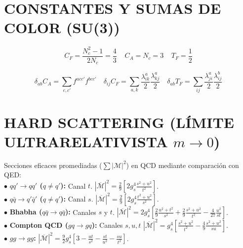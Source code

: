 \section{CONSTANTES Y SUMAS DE COLOR (SU(3))}

$$C_F\!=\! \frac{N_c^2-1}{2N_c}\!=\!\frac{4}{3}\;\;\;\;C_A\!\!=\! N_c \!=\! 3\;\;\;\;T_F\!=\! \frac{1}{2}$$


$$\delta_{ab}C_A = \sum_{c,c'} f^{acc'}f^{bcc'}\quad \delta_{ij} C_F = \sum_{a,k}\frac{\lambda^a_{ik}}{2}\frac{\lambda^a_{kj}}{2}\quad\delta_{ab}T_F = \sum_{ij} \frac{\lambda^{a}_{ji}}{2} \frac{\lambda^{b}_{ij}}{2}$$



\section{HARD SCATTERING (LÍMITE ULTRARELATIVISTA $m \to 0$)}
Secciones eficaces promediadas ($\sum | \mathcal{M} |^2$) en QCD mediante comparación con QED: \\
$\bullet$ \textbf{$qq' \to qq'$ ($q \neq q'$):} Canal $t$. \quad 
$|\overline{\mathcal{M}}|^2 = \frac{2}{9} [2g_s^4 \frac{s^2+u^2}{t^2}]$. \\
$\bullet$ \textbf{$q\bar{q} \to q'\bar{q}'$ ($q \neq q'$):} Canal $s$.\quad
$|\overline{\mathcal{M}}|^2 = \frac{2}{9} [2g_s^4 \frac{t^2+u^2}{s^2}]$. \\
$\bullet$ \textbf{Bhabha ($q\bar{q} \to q\bar{q}$):} Canales $s$ y $t$. \quad $|\overline{\mathcal{M}}|^2 = 2g_s^4 [\frac{2}{9}\frac{u^2+t^2}{s^2} + \frac{2}{9}\frac{s^2+u^2}{t^2} - \frac{4}{27}\frac{u^2}{st}]$. \\
$\bullet$ \textbf{Compton QCD ($gq \to gq$):} Canales $s, u, t$ \quad
$|\overline{\mathcal{M}}|^2 = g_s^4 [\frac{s^2+u^2}{t^2} - \frac{4}{9}\frac{s^2+u^2}{su}]$. \\
$\bullet$ \textbf{$gg \to gg$:} $|\overline{\mathcal{M}}|^2 = \frac{9}{2} g_s^4 [3 - \frac{ut}{s^2} - \frac{st}{u^2} - \frac{su}{t^2}]$.


